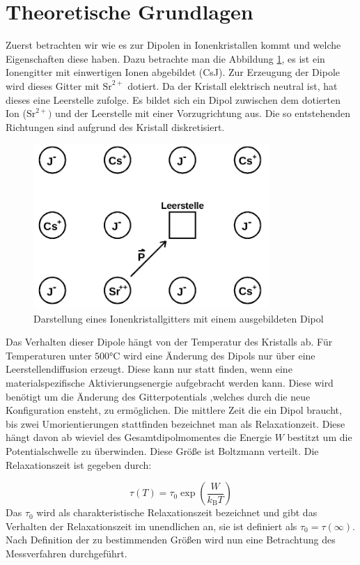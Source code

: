 \section{Theoretische Grundlagen}
\label{sec:Theorie}
Zuerst betrachten wir wie es zur Dipolen in Ionenkristallen kommt und welche
Eigenschaften diese haben. Dazu betrachte man die Abbildung \ref{theo1}, es ist
ein Ionengitter mit einwertigen Ionen abgebildet (CsJ). Zur Erzeugung
der Dipole wird dieses Gitter mit $\text{Sr}^{2+}$ dotiert. Da der Kristall
elektrisch neutral ist, hat dieses eine Leerstelle zufolge. Es bildet
sich ein Dipol zuwischen dem dotierten Ion ($\text{Sr}^{2+})$ und der Leerstelle
mit einer Vorzugrichtung aus. Die so entstehenden Richtungen sind aufgrund
des Kristall diskretisiert.
\begin{figure}
\centering
\includegraphics[width=0.8\textwidth]{ressources/ionengitter.png}
\caption{Darstellung eines Ionenkristallgitters mit einem ausgebildeten Dipol}
\label{theo1}
\end{figure}
Das Verhalten dieser Dipole hängt von der Temperatur des Kristalls ab. Für
Temperaturen unter $500°$C wird eine Änderung des Dipols nur über eine
Leerstellendiffusion erzeugt.
Diese kann nur statt finden, wenn eine materialspezifische Aktivierungsenergie
aufgebracht werden kann. Diese wird benötigt um die Änderung des Gitterpotentials
,welches durch die neue Konfiguration ensteht, zu ermöglichen. Die mittlere
Zeit die ein Dipol braucht, bis zwei Umorientierungen stattfinden bezeichnet man
als Relaxationzeit. Diese hängt davon ab wieviel des Gesamtdipolmomentes die Energie
$W$ bestitzt um die Potentialschwelle zu überwinden. Diese Größe ist
Boltzmann verteilt. Die Relaxationszeit ist gegeben durch:


\begin{equation}
    \label{Formel1}
\tau(T)=\tau_0 \exp(\frac{W}{k_\text{B}T})
\end{equation}
Das $\tau_0$ wird als charakteristische Relaxationszeit bezeichnet und
gibt das Verhalten der Relaxationszeit im unendlichen an, sie ist
definiert als $\tau_0=\tau(\infty)$. Nach Definition der zu bestimmenden
Größen wird nun eine Betrachtung des Messverfahren durchgeführt.
